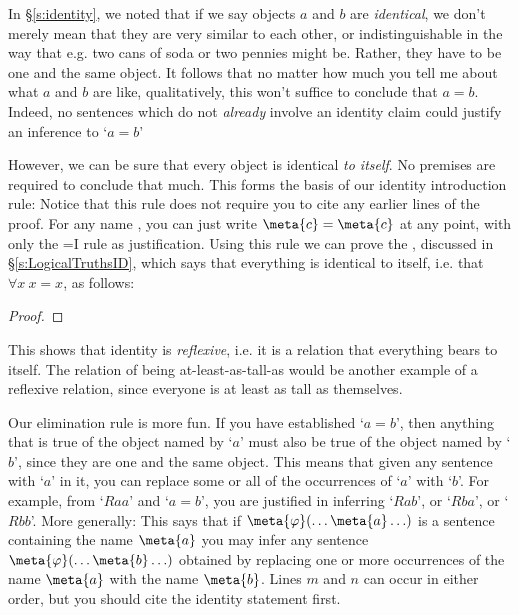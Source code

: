 In \S\ref{s:identity}, we noted that if we say objects $a$ and $b$ are \emph{identical}, we don't merely mean that they are very similar to each other, or indistinguishable in the way that e.g. two cans of soda or two pennies might be. Rather, they have to be one and the same object. It follows that no matter how much you tell me about what  $a$ and $b$ are like, qualitatively, this won't suffice to conclude that $a=b$.  Indeed, no sentences which do not \emph{already} involve an identity claim could justify an inference to `$a=b$'


However, we can be sure that every object is identical \emph{to itself}. No premises are required to conclude that much. This forms the basis of our identity introduction rule:
Notice that this rule does not require you to cite any earlier lines of the proof. For any name , you can just write $\meta{c}=\meta{c}$ at any point, with only the {=}I rule as justification.  Using this rule we can prove the , discussed in \S\ref{s:LogicalTruthsID}, which says that everything is identical to itself, i.e. that $\forall x \ x = x$, as follows:

\begin{proof}
\open
	 \fl{}
	 
\close
{} 
\end{proof}
This shows that identity is \emph{reflexive}, i.e. it is a relation that everything bears to itself.  The relation of being at-least-as-tall-as would be another example of a reflexive relation, since everyone is at least as tall as themselves. 

Our elimination rule is more fun. If you have established `$a=b$', then anything that is true of the object named by `$a$' must also be true of the object named by `$b$', since they are one and the same object. This means that given any sentence with `$a$' in it, you can replace some or all of the occurrences of `$a$' with `$b$'. For example, from `$Raa$' and `$a = b$', you are justified in inferring `$Rab$', or `$Rba$', or `$Rbb$'. More generally:
This says that if $\meta{\varphi}(\ldots \meta{a} \ldots)$ is a sentence containing the name $\meta{a}$ you may infer any sentence $\meta{\varphi}(\ldots \meta{b} \ldots)$ obtained by replacing one or more occurrences of the name $\meta{a}$ with the name $\meta{b}$. Lines $m$ and $n$ can occur in either order, but you should cite the identity statement first.  

